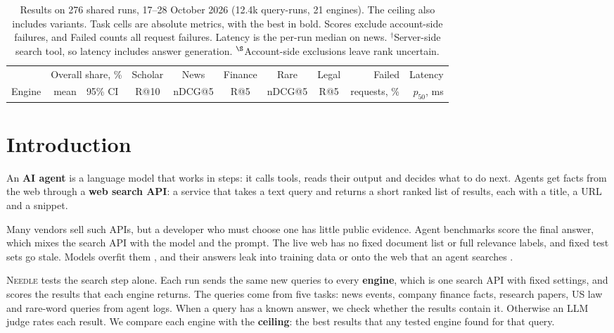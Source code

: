 \documentclass[11pt]{article}
\makeatletter
\newcommand{\needle}{\textsc{Needle}\xspace}
\newcommand{\ndcg}{nDCG@5\xspace}
\makeatother
\begin{document}
\begin{table}[t]
\centering\footnotesize
\setlength{\tabcolsep}{0pt}
\begin{tabular*}{\textwidth}{@{\extracolsep{\fill}}lrlcccccrr@{}}
\toprule
 & \multicolumn{2}{c}{Overall share, \%} & Scholar & News & Finance & Rare & Legal & Failed & Latency \\
Engine & mean & 95\% CI & R@10 & \ndcg & R@5 & \ndcg & R@5 & requests, \% & $p_{50}$, ms \\
\midrule

\bottomrule
\end{tabular*}
\caption{Results on 276 shared runs, 17--28 October 2026 (12.4k
query-runs, 21 engines). The ceiling also includes variants. Task cells
are absolute metrics, with the best in bold.
Scores exclude account-side failures, and Failed counts all request
failures. Latency is the per-run median on
news. $^\dagger$Server-side search tool, so latency includes answer
generation. $^\S$Account-side exclusions leave rank uncertain.}
\label{tab:results}
\end{table}

\section{Introduction}

An \textbf{AI agent} is a language model that works in steps: it calls
tools, reads their output and decides what to do next. Agents get facts
from the web through a \textbf{web search API}: a
service that takes a text query and returns a short ranked list of
results, each with a title, a URL and a snippet.

Many vendors sell such APIs, but a developer who must choose one has
little public evidence. Agent benchmarks score the final answer, which
mixes the search API with the model and the prompt. The live web
has no fixed document list or full relevance labels, and fixed test sets
go stale. Models overfit them \citep{gupta2024changing}, and their
answers leak into training data
\citep{sainz2023trouble,balloccu2024leak} or onto the web that an agent
searches \citep{han2025searchtime}.

\needle tests the search step alone. Each run sends the same new queries
to every \textbf{engine}, which is one search API with fixed settings,
and scores the results that each engine returns. The queries come from
five tasks: news events, company finance facts, research papers, US law
and rare-word queries from agent logs.
When a query has a known answer, we check
whether the results contain it. Otherwise an LLM judge rates each result.
We compare each engine with the \textbf{ceiling}: the best results that
any tested engine found for that query.
\end{document}
